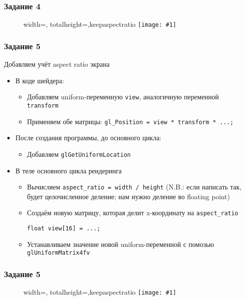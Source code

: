 \documentclass{beamer}
\newcommand{\slideimage}[1]{
  \begin{figure}
    \begin{adjustbox}{width=\textwidth, totalheight=\textheight-2\baselineskip-2\baselineskip,keepaspectratio}
      \texttt{[image: \#1]}
    \end{adjustbox}
  \end{figure}
}
\begin{document}
\begin{frame}
\frametitle{Задание 4}
\slideimage{4.png}
\end{frame}

\begin{frame}[fragile]
\frametitle{Задание 5}
Добавляем учёт aspect ratio экрана
\begin{itemize}
\item В коде шейдера:
\begin{itemize}
\item Добавляем uniform-переменную \verb|view|, аналогичную переменной \verb|transform|
\item Применяем обе матрицы: \verb|gl_Position = view * transform * ...;|
\end{itemize}
\item После создания программы, до основного цикла:
\begin{itemize}
\item Добавляем \verb|glGetUniformLocation|
\end{itemize}
\item В теле основного цикла рендеринга
\begin{itemize}
\item Вычисляем \verb|aspect_ratio = width / height| (N.B.: если написать так, будет целочисленное деление; нам нужно деление во floating point)
\item Создаём новую матрицу, которая делит x-координату на \verb|aspect_ratio|
\begin{verbatim}
float view[16] = ...;
\end{verbatim}
\item Устанавливаем значение новой uniform-переменной с помозью \verb|glUniformMatrix4fv|
\end{itemize}
\end{itemize}
\end{frame}

\begin{frame}
\frametitle{Задание 5}
\slideimage{5.png}
\end{frame}
\end{document}
